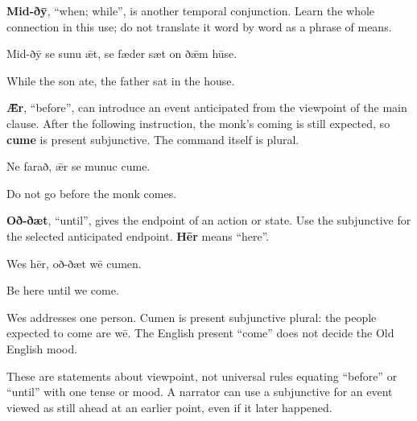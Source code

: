 \textbf{Mid-ðȳ}, “when; while”, is another temporal conjunction. Learn the whole connection in this use; do not translate it word by word as a phrase of means.

Mid-ðȳ se sunu ǣt, se fæder sæt on ðǣm hūse.

While the son ate, the father sat in the house.

\textbf{Ǣr}, “before”, can introduce an event anticipated from the viewpoint of the main clause. After the following instruction, the monk’s coming is still expected, so \textbf{cume} is present subjunctive. The command itself is plural.

Ne farað, ǣr se munuc cume.

Do not go before the monk comes.

\textbf{Oð-ðæt}, “until”, gives the endpoint of an action or state. Use the subjunctive for the selected anticipated endpoint. \textbf{Hēr} means “here”.

Wes hēr, oð-ðæt wē cumen.

Be here until we come.

Wes addresses one person. Cumen is present subjunctive plural: the people expected to come are wē. The English present “come” does not decide the Old English mood.

These are statements about viewpoint, not universal rules equating “before” or “until” with one tense or mood. A narrator can use a subjunctive for an event viewed as still ahead at an earlier point, even if it later happened.

